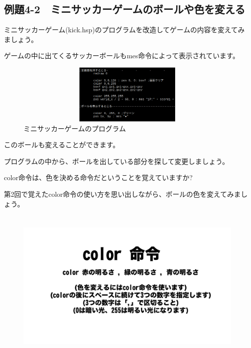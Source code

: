 \newpage
\subsection{例題4-2　ミニサッカーゲームのボールや色を変える}

\begin{description}
    \item {}
\end{description}

ミニサッカーゲーム(kick.hsp)のプログラムを改造してゲームの内容を変えてみましょう。

ゲームの中に出てくるサッカーボールもmes命令によって表示されています。


\begin{figure}[H]
    \begin{center}
      \includegraphics[keepaspectratio,width=14.499cm,height=2.91cm]{text04-img/text04-img008.png}
      \caption{ミニサッカーゲームのプログラム}
    \end{center}
    \label{fig:prog_menu}
\end{figure}


このボールも変えることができます。

プログラムの中から、ボールを出している部分を探して変更しましょう。



color命令は、色を決める命令だということを覚えていますか?

第2回で覚えたcolor命令の使い方を思い出しながら、ボールの色を変えてみましょう。


\begin{figure}[H]
    \begin{center}
      \includegraphics[keepaspectratio,width=12.409cm,height=7.62cm]{text04-img/text04-img009.png}
    \end{center}
    \label{fig:prog_menu}
\end{figure}


